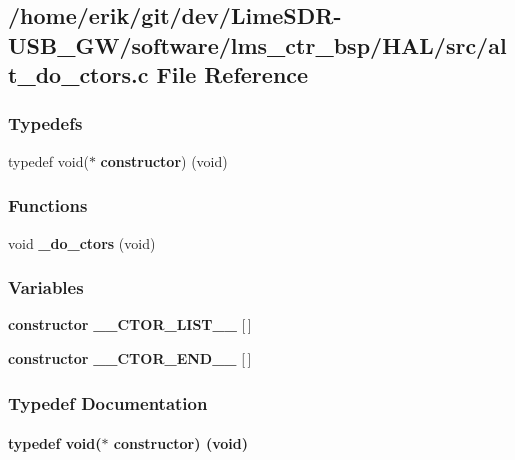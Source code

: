 \subsection{/home/erik/git/dev/\+Lime\+S\+D\+R-\/\+U\+S\+B\+\_\+\+G\+W/software/lms\+\_\+ctr\+\_\+bsp/\+H\+A\+L/src/alt\+\_\+do\+\_\+ctors.c File Reference}
\label{alt__do__ctors_8c}
\subsubsection*{Typedefs}
\begin{DoxyCompactItemize}
\item 
typedef void($\ast$ {\bf constructor}) (void)
\end{DoxyCompactItemize}
\subsubsection*{Functions}
\begin{DoxyCompactItemize}
\item 
void {\bf \+\_\+do\+\_\+ctors} (void)
\end{DoxyCompactItemize}
\subsubsection*{Variables}
\begin{DoxyCompactItemize}
\item 
{\bf constructor} {\bf \+\_\+\+\_\+\+C\+T\+O\+R\+\_\+\+L\+I\+S\+T\+\_\+\+\_\+} [$\,$]
\item 
{\bf constructor} {\bf \+\_\+\+\_\+\+C\+T\+O\+R\+\_\+\+E\+N\+D\+\_\+\+\_\+} [$\,$]
\end{DoxyCompactItemize}


\subsubsection{Typedef Documentation}
\paragraph[{constructor}]{\setlength{\rightskip}{0pt plus 5cm}typedef void($\ast$ constructor) (void)}\label{alt__do__ctors_8c_a7ff717e6224f9c4bfe641ce0a840a513}


